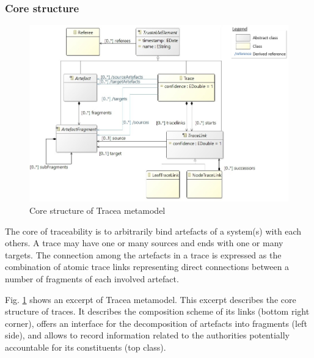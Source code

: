 \subsubsection{Core structure}\label{sec:core}
\begin{figure}[ht] 
	\centering
	\includegraphics[width=.85\linewidth]{images/core.jpg}
	\caption{Core structure of Tracea metamodel}
	\label{fig:mm-core}
\end{figure}

The core of traceability is to arbitrarily bind artefacts of a system(s) with each others. A trace may have one or many sources and ends with one or many targets. The connection among the artefacts in a trace is expressed as the combination of atomic trace links representing direct connections between a number of fragments of each involved artefact.

Fig. \ref{fig:mm-core} shows an excerpt of Tracea metamodel. This excerpt describes the core structure of traces. It describes the composition scheme of its links (bottom right corner), offers an interface for the decomposition of artefacts into fragments (left side), and allows to record information related to the authorities potentially accountable for its constituents (top class).


